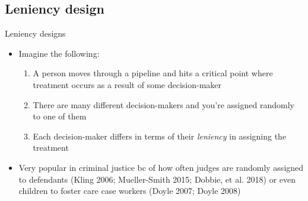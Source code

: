 \documentclass{beamer}
\begin{document}


\subsection{Leniency design}

\begin{frame}{Leniency designs}

	\begin{itemize}
	\item Imagine the following:
		\begin{enumerate}
		\item A person moves through a pipeline and hits a critical point where treatment occurs as a result of some decision-maker
		\item There are many different decision-makers and you're assigned randomly to one of them
		\item Each decision-maker differs in terms of their \emph{leniency} in assigning the treatment
		\end{enumerate}
	\item Very popular in criminal justice bc of how often judges are randomly assigned to defendants (Kling 2006; Mueller-Smith 2015; Dobbie, et al. 2018) or even children to foster care case workers (Doyle 2007; Doyle 2008)
	\end{itemize}
\end{frame}
\end{document}
